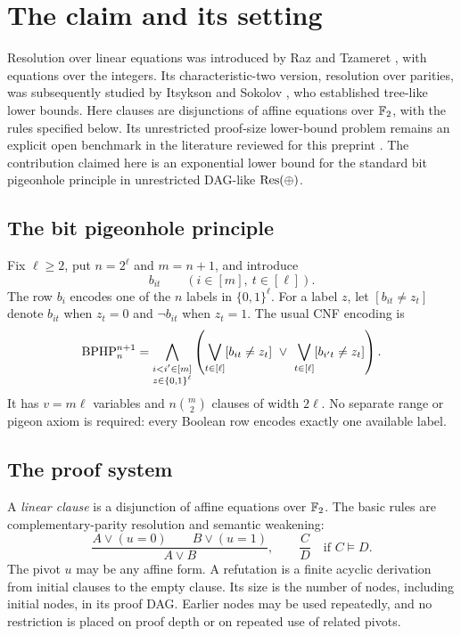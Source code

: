 \section{The claim and its setting}\label{sec:introduction}

Resolution over linear equations was introduced by Raz and Tzameret
\cite{RT08}, with equations over the integers. Its characteristic-two
version, resolution over parities, was subsequently studied by Itsykson
and Sokolov \cite{IS14,IS20}, who established tree-like lower bounds.
Here clauses are disjunctions of affine equations over \(\mathbb F_2\), with the
rules specified below. Its unrestricted proof-size lower-bound problem remains an
explicit open benchmark in the literature reviewed for this preprint
\cite{IPS26}. The contribution claimed here is an exponential lower
bound for the standard bit pigeonhole principle in unrestricted DAG-like
\(\mathrm{Res}(\oplus)\).

\subsection{The bit pigeonhole principle}
Fix \(\ell\ge2\), put \(n=2^\ell\) and \(m=n+1\), and introduce
\[
  b_{it}\qquad (i\in[m],\ t\in[\ell]).
\]
The row \(b_i\) encodes one of the \(n\) labels in \(\{0,1\}^{\ell}\).
For a label \(z\), let \([b_{it}\ne z_t]\) denote \(b_{it}\) when \(z_t=0\)
and \(\neg b_{it}\) when \(z_t=1\). The usual CNF encoding is
\begin{equation}\label{eq:bit-php}
 \mathrm{BPHP}_n^{n+1}
  =\bigwedge_{\substack{i<i'\in[m]\\z\in\{0,1\}^{\ell}}}
    \left(\bigvee_{t\in[\ell]}[b_{it}\ne z_t]
       \ \vee\ \bigvee_{t\in[\ell]}[b_{i't}\ne z_t]\right).
\end{equation}
It has \(v=m\ell\) variables and \(n\binom m2\) clauses of width \(2\ell\).
No separate range or pigeon axiom is required: every Boolean row encodes
exactly one available label.

\subsection{The proof system}
A \emph{linear clause} is a disjunction of affine equations over \(\mathbb F_2\).
The basic rules are complementary-parity resolution and semantic weakening:
\begin{equation}\label{eq:res-rules}
 \frac{A\vee(u=0)\qquad B\vee(u=1)}{A\vee B},
 \qquad
 \frac{C}{D}\quad\text{if } C\models D.
\end{equation}
The pivot \(u\) may be any affine form. A refutation is a finite acyclic
derivation from initial clauses to the empty clause. Its size is the number
of nodes, including initial nodes, in its proof DAG. Earlier nodes may be
used repeatedly, and no restriction is placed on proof depth or on repeated
use of related pivots.

